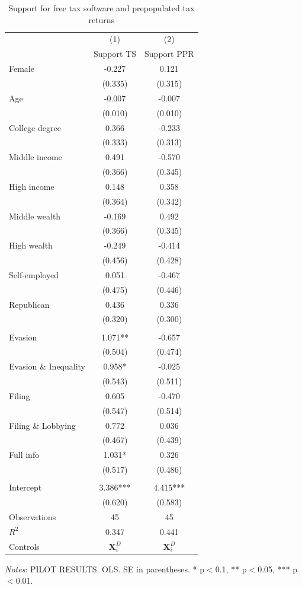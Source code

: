 \documentclass[11pt]{article}
\begin{document}
\FloatBarrier
\begin{table}[!htbp]\centering
\caption{Support for free tax software and prepopulated tax returns}
\label{tab:supporttaxsoftware_c}
\begin{threeparttable}
\footnotesize
\begin{tabular}{l|cc}
\toprule
& (1) & (2) \\
& Support TS & Support PPR \\
\midrule
Female & -0.227 & 0.121 \\
 & (0.335) & (0.315) \\
Age & -0.007 & -0.007 \\
 & (0.010) & (0.010) \\
College degree & 0.366 & -0.233 \\
 & (0.333) & (0.313) \\
Middle income & 0.491 & -0.570 \\
 & (0.366) & (0.345) \\
High income & 0.148 & 0.358 \\
 & (0.364) & (0.342) \\
Middle wealth & -0.169 & 0.492 \\
 & (0.366) & (0.345) \\
High wealth & -0.249 & -0.414 \\
 & (0.456) & (0.428) \\
Self-employed & 0.051 & -0.467 \\
 & (0.475) & (0.446) \\
Republican & 0.436 & 0.336 \\
 & (0.320) & (0.300) \\
\\[0.5em]
Evasion & 1.071** & -0.657 \\
 & (0.504) & (0.474) \\
Evasion \& Inequality & 0.958* & -0.025 \\
 & (0.543) & (0.511) \\
Filing & 0.605 & -0.470 \\
 & (0.547) & (0.514) \\
Filing \& Lobbying & 0.772 & 0.036 \\
 & (0.467) & (0.439) \\
Full info & 1.031* & 0.326 \\
 & (0.517) & (0.486) \\
\\[0.5em]
Intercept & 3.386*** & 4.415*** \\
 & (0.620) & (0.583) \\
\midrule
Observations & 45 & 45 \\
$R^2$ & 0.347 & 0.441 \\
Controls & $\mathbf{X}_{i}^{D}$ & $\mathbf{X}_{i}^{D}$ \\
\bottomrule
\end{tabular}
\begin{tablenotes}[flushleft]
\footnotesize
\item \textit{Notes}: PILOT RESULTS. OLS. SE in parentheses. * p$<$0.1, ** p$<$0.05, *** p$<$0.01.
\end{tablenotes}
\end{threeparttable}
\end{table}
\end{document}
